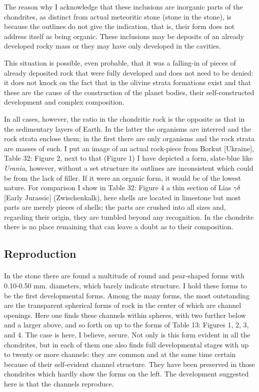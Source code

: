 \documentclass[a4paper, 12pt, oneside]{article}
\begin{document}
The reason why I acknowledge that these inclusions are inorganic parts of the chondrites, as distinct from actual meteoritic stone (stone in the stone), is because the outlines do not give the indication, that is, their form does not address itself as being organic. These inclusions may be deposits of an already developed rocky mass or they may have only developed in the cavities.

This situation is possible, even probable, that it was a falling-in of pieces of already deposited rock that were fully developed and does not need to be denied: it does not knock on the fact that in the olivine strata formations exist and that these are the cause of the construction of the planet bodies, their self-constructed development and complex composition.

In all cases, however, the ratio in the chondritic rock is the opposite as that in the sedimentary layers of Earth. In the latter the organisms are interred and the rock strata enclose them; in the first there are only organisms and the rock strata are masses of such. I put an image of an actual rock-piece from Borkut [Ukraine], Table 32: Figure 2, next to that (Figure 1) I have depicted a form, slate-blue like \emph{Urania}, however, without a set structure its outlines are inconsistent which could be from the lack of filler. If it were an organic form, it would be of the lowest nature. For comparison I show in Table 32: Figure 4 a thin section of Lias $\gamma\delta$ [Early Jurassic] (Zwischenkalk), here shells are located in limestone but most parts are merely pieces of shells; the parts are crushed into all sizes and, regarding their origin, they are tumbled beyond any recognition. In the chondrite there is no place remaining that can leave a doubt as to their composition.
\clearpage
\subsection{Reproduction}
\paragraph*{}
In the stone there are found a multitude of round and pear-shaped forms with 0.10-0.50 mm. diameters, which barely indicate structure. I hold these forms to be the first developmental forms. Among the many forms, the most outstanding are the transparent spherical forms of rock in the center of which are channel openings. Here one finds these channels within spheres, with two further below and a larger above, and so forth on up to the forms of Table 13: Figures 1, 2, 3, and 4. The case is here, I believe, secure. Not only is this form evident in all the chondrites, but in each of them one also finds full developmental stages with up to twenty or more channels: they are common and at the same time certain because of their self-evident channel structure. They have been preserved in those chondrites which hardly show the forms on the left. The development suggested here is that the channels reproduce.
\end{document}
